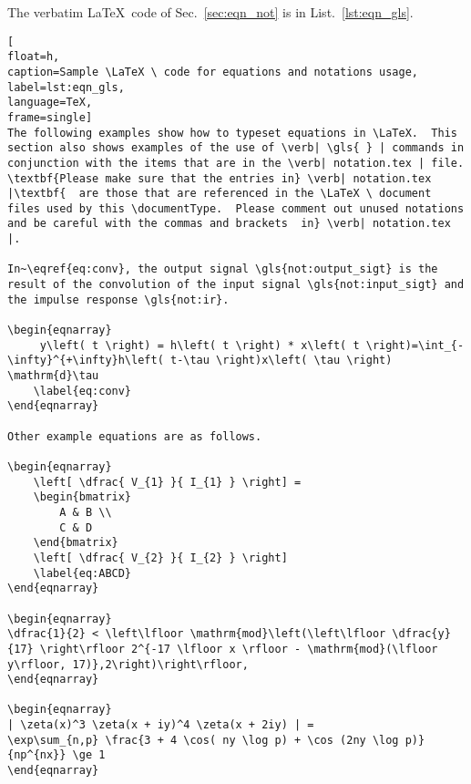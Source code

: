 \newpage
The verbatim \LaTeX \ code of Sec.~\ref{sec:eqn_not} is in List.~\ref{lst:eqn_gls}.

\begin{lstlisting}[
float=h,
caption=Sample \LaTeX \ code for equations and notations usage, 
label=lst:eqn_gls,
language=TeX,
frame=single]
The following examples show how to typeset equations in \LaTeX.  This section also shows examples of the use of \verb| \gls{ } | commands in conjunction with the items that are in the \verb| notation.tex | file. \textbf{Please make sure that the entries in} \verb| notation.tex |\textbf{  are those that are referenced in the \LaTeX \ document files used by this \documentType.  Please comment out unused notations and be careful with the commas and brackets  in} \verb| notation.tex |.

In~\eqref{eq:conv}, the output signal \gls{not:output_sigt} is the result of the convolution of the input signal \gls{not:input_sigt} and the impulse response \gls{not:ir}.

\begin{eqnarray}   
     y\left( t \right) = h\left( t \right) * x\left( t \right)=\int_{-\infty}^{+\infty}h\left( t-\tau \right)x\left( \tau \right) \mathrm{d}\tau
	\label{eq:conv}
\end{eqnarray}

Other example equations are as follows.

\begin{eqnarray}
	\left[ \dfrac{ V_{1} }{ I_{1} } \right] = 
	\begin{bmatrix}
		A & B \\ 
		C & D 
	\end{bmatrix} 
	\left[ \dfrac{ V_{2} }{ I_{2} } \right]
	\label{eq:ABCD}
\end{eqnarray}

\begin{eqnarray}
\dfrac{1}{2} < \left\lfloor \mathrm{mod}\left(\left\lfloor \dfrac{y}{17} \right\rfloor 2^{-17 \lfloor x \rfloor - \mathrm{mod}(\lfloor y\rfloor, 17)},2\right)\right\rfloor,
\end{eqnarray}

\begin{eqnarray}
| \zeta(x)^3 \zeta(x + iy)^4 \zeta(x + 2iy) | = 
\exp\sum_{n,p} \frac{3 + 4 \cos( ny \log p) + \cos (2ny \log p)}{np^{nx}} \ge 1
\end{eqnarray}
\end{lstlisting}
\cleardoublepage







